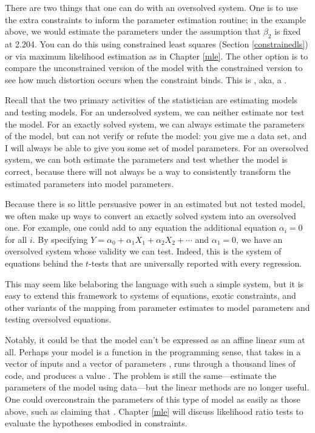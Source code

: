 There are two things that one can do with an oversolved system. One is
to use the extra constraints to inform the parameter estimation routine;
in the example above, we would estimate the parameters under the
assumption that $\beta_2$ is fixed at 2.204.
You can do this using constrained least squares (Section
\ref{constrainedls}) or via maximum likelihood estimation as in Chapter
\ref{mle}. The other option is to compare the unconstrained version of
the model with the constrained version to see how much distortion occurs
when the constraint binds. This is , aka,
a .

Recall that the two primary activities of the statistician are estimating
models and testing models.  For an undersolved system, we can neither
estimate nor test the model. For an exactly solved system, we can always
estimate the parameters of the model, but can not verify or refute the
model: you give me a data set, and I will always be able to give you
some set of model parameters. For an oversolved system, we can both
estimate the parameters and test whether the model is correct, because
there will not always be a way to consistently transform the estimated
parameters into model parameters.

Because there is so little persuasive power in an estimated but not
tested model, we often make up
ways to convert an exactly solved system into an oversolved one.
For example, one could add to any equation the additional equation
$\alpha_i = 0$ for all $i$.
By specifying
$Y = \alpha_0 + \alpha_1 X_1 + \alpha_2 X_2 + \cdots$ and $\alpha_1=0$,
we have an oversolved system whose validity we can test. Indeed, this
is the system of equations behind the $t$-tests that are universally
reported with every regression.

This may seem like belaboring the language with such a simple system,
but it is easy to extend this framework to systems of equations, 
exotic constraints, and other variants of the mapping from parameter
estimates to model parameters and testing oversolved equations.

Notably, it could be that the model can't be expressed as an affine
linear sum at all. Perhaps your model is a function in the programming
sense, that takes in a vector of inputs  and a
vector of parameters , runs
through a thousand lines of code, and produces a value . The
problem is still the same---estimate the parameters of the model using
data---but the linear methods are no longer useful. 
One could overconstrain the parameters of
this type of model as easily as those above, such as claiming that
. Chapter \ref{mle} will discuss likelihood
ratio tests to evaluate the hypotheses embodied in constraints.

